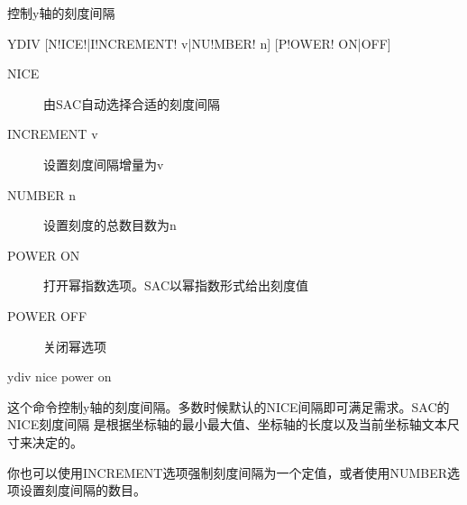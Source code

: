 \label{cmd:ydiv}

控制y轴的刻度间隔

\begin{SACSTX}
YDIV [N!ICE!|I!NCREMENT! v|NU!MBER! n] [P!OWER! ON|OFF]
\end{SACSTX}

\begin{description}
\item [NICE] 由SAC自动选择合适的刻度间隔
\item [INCREMENT v] 设置刻度间隔增量为v
\item [NUMBER n] 设置刻度的总数目数为n  
\item [POWER ON] 打开幂指数选项。SAC以幂指数形式给出刻度值
\item [POWER OFF] 关闭幂选项 
\end{description}

\begin{SACDFT}
ydiv nice power on
\end{SACDFT}

这个命令控制y轴的刻度间隔。多数时候默认的NICE间隔即可满足需求。SAC的NICE刻度间隔
是根据坐标轴的最小最大值、坐标轴的长度以及当前坐标轴文本尺寸来决定的。

你也可以使用INCREMENT选项强制刻度间隔为一个定值，或者使用NUMBER选项设置刻度间隔的数目。
